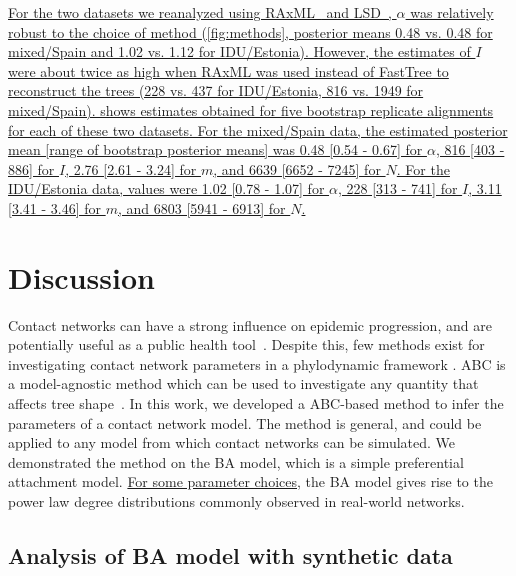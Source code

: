 \documentclass[12pt]{article}\usepackage[]{graphicx}\usepackage[]{color}
\let\mref\cref
\let\Mref\Cref
\renewcommand{\cref}[1]{\mbox{\mref{#1}}}
\renewcommand{\Cref}[1]{\mbox{\Mref{#1}}}
\newcommand{\add}[1]{\color{blue} \uline{#1} \color{black}}
\begin{document}
\add{For the two datasets we reanalyzed using
RAxML~\autocite{stamatakis2014raxml} and LSD~\autocite{to2016fast}, $\alpha$
was relatively robust to the choice of method (\cref{fig:methods}, posterior
means 
    0.48
vs. 
    0.48
for mixed/Spain and 
    1.02
vs.
    1.12
for IDU/Estonia). However, the estimates of $I$ were about twice as high when
RAxML was used instead of FastTree to reconstruct the trees 
    (228 
     vs. 437 for IDU/Estonia, 
    816
    vs. 1949 for mixed/Spain). 
\Cref{fig:boot} shows estimates obtained for five bootstrap replicate
alignments for each of these two datasets. For the mixed/Spain data, the
estimated posterior mean [range of bootstrap posterior means] was
    0.48
    [0.54 -
     0.67]
for $\alpha$, 
    816
    [403 -
     886] for $I$,
    2.76
    [2.61 -
     3.24] for $m$, and
    6639
    [6652 -
     7245] for $N$. 
For the IDU/Estonia data, values were
    1.02
    [0.78 -
     1.07]
for $\alpha$, 
    228
    [313 -
     741] for $I$,
    3.11
    [3.41 -
     3.46] for $m$, and
    6803
    [5941 -
    6913] for $N$.}

\section*{Discussion}

Contact networks can have a strong influence on epidemic progression, and are
potentially useful as a public health tool~\autocite{wang2015targeting,
little2014using}. Despite this, few methods exist for investigating contact
network parameters in a phylodynamic framework \autocite[although see][for
related work]{groendyke2011bayesian, volz2008sir, brown2011transmission,
leventhal2012inferring}. ABC is a model-agnostic method which can be used to
investigate any quantity that affects tree
shape~\autocite{poon2015phylodynamic}. In this work, we developed a ABC-based
method to infer the parameters of a contact network model. The method is
general, and could be applied to any model from which contact networks can be
simulated. We demonstrated the method on the BA model, which is a simple
preferential attachment model. \add{For some parameter choices,} the BA model
gives rise to the power law degree distributions commonly observed in
real-world networks.

\subsection*{Analysis of BA model with synthetic data}
\end{document}
